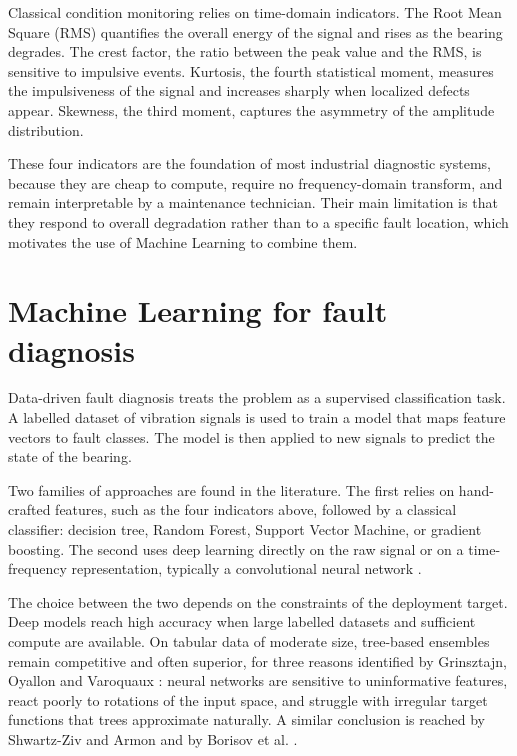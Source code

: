 Classical condition monitoring relies on time-domain indicators. The Root Mean Square (RMS) quantifies the overall energy of the signal and rises as the bearing degrades. The crest factor, the ratio between the peak value and the RMS, is sensitive to impulsive events. Kurtosis, the fourth statistical moment, measures the impulsiveness of the signal and increases sharply when localized defects appear. Skewness, the third moment, captures the asymmetry of the amplitude distribution.

These four indicators are the foundation of most industrial diagnostic systems, because they are cheap to compute, require no frequency-domain transform, and remain interpretable by a maintenance technician. Their main limitation is that they respond to overall degradation rather than to a specific fault location, which motivates the use of Machine Learning to combine them.

\section{Machine Learning for fault diagnosis}

Data-driven fault diagnosis treats the problem as a supervised classification task. A labelled dataset of vibration signals is used to train a model that maps feature vectors to fault classes. The model is then applied to new signals to predict the state of the bearing.

Two families of approaches are found in the literature. The first relies on hand-crafted features, such as the four indicators above, followed by a classical classifier: decision tree, Random Forest, Support Vector Machine, or gradient boosting. The second uses deep learning directly on the raw signal or on a time-frequency representation, typically a convolutional neural network \cite{zhang2020bearing}.

The choice between the two depends on the constraints of the deployment target. Deep models reach high accuracy when large labelled datasets and sufficient compute are available. On tabular data of moderate size, tree-based ensembles remain competitive and often superior, for three reasons identified by Grinsztajn, Oyallon and Varoquaux \cite{grinsztajn2022tree}: neural networks are sensitive to uninformative features, react poorly to rotations of the input space, and struggle with irregular target functions that trees approximate naturally. A similar conclusion is reached by Shwartz-Ziv and Armon \cite{shwartz2022tabular} and by Borisov et al. \cite{borisov2024deep}.

